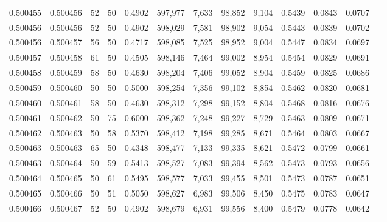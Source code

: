 \begin{tabular}{rrrrrrrrrrrrr}
0.500455 & 0.500456 &    52 &  50 &                                     0.4902 & 597,977 &   7,633 &  98,852 &   9,104 & 0.5439 & 0.0843 & 0.0707 \\
0.500456 & 0.500456 &    52 &  50 &                                     0.4902 & 598,029 &   7,581 &  98,902 &   9,054 & 0.5443 & 0.0839 & 0.0702 \\
0.500456 & 0.500457 &    56 &  50 &                                     0.4717 & 598,085 &   7,525 &  98,952 &   9,004 & 0.5447 & 0.0834 & 0.0697 \\
0.500457 & 0.500458 &    61 &  50 &                                     0.4505 & 598,146 &   7,464 &  99,002 &   8,954 & 0.5454 & 0.0829 & 0.0691 \\
0.500458 & 0.500459 &    58 &  50 &                                     0.4630 & 598,204 &   7,406 &  99,052 &   8,904 & 0.5459 & 0.0825 & 0.0686 \\
0.500459 & 0.500460 &    50 &  50 &                                     0.5000 & 598,254 &   7,356 &  99,102 &   8,854 & 0.5462 & 0.0820 & 0.0681 \\
0.500460 & 0.500461 &    58 &  50 &                                     0.4630 & 598,312 &   7,298 &  99,152 &   8,804 & 0.5468 & 0.0816 & 0.0676 \\
0.500461 & 0.500462 &    50 &  75 &                                     0.6000 & 598,362 &   7,248 &  99,227 &   8,729 & 0.5463 & 0.0809 & 0.0671 \\
0.500462 & 0.500463 &    50 &  58 &                                     0.5370 & 598,412 &   7,198 &  99,285 &   8,671 & 0.5464 & 0.0803 & 0.0667 \\
0.500463 & 0.500463 &    65 &  50 &                                     0.4348 & 598,477 &   7,133 &  99,335 &   8,621 & 0.5472 & 0.0799 & 0.0661 \\
0.500463 & 0.500464 &    50 &  59 &                                     0.5413 & 598,527 &   7,083 &  99,394 &   8,562 & 0.5473 & 0.0793 & 0.0656 \\
0.500464 & 0.500465 &    50 &  61 &                                     0.5495 & 598,577 &   7,033 &  99,455 &   8,501 & 0.5473 & 0.0787 & 0.0651 \\
0.500465 & 0.500466 &    50 &  51 &                                     0.5050 & 598,627 &   6,983 &  99,506 &   8,450 & 0.5475 & 0.0783 & 0.0647 \\
0.500466 & 0.500467 &    52 &  50 &                                     0.4902 & 598,679 &   6,931 &  99,556 &   8,400 & 0.5479 & 0.0778 & 0.0642 \\

\end{tabular}

